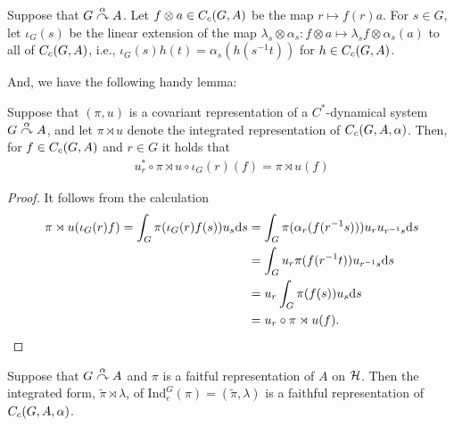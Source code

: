 \begin{definition}
Suppose that $G \stackrel{\alpha}{\curvearrowright} A$. Let $f \otimes a  \in C_c(G,A)$ be the map $r \mapsto f(r)a$. For $s \in G$, let $\iota_G(s)$ be the linear extension of the map $\lambda_s \otimes \alpha_s \colon f \otimes a \mapsto \lambda_s f \otimes \alpha_s(a)$ to all of $C_c(G,A)$, i.e., $\iota_G(s) h(t) = \alpha_s(h(s^{-1}t))$ for $h \in C_c(G,A)$.
\end{definition}
And, we have the following handy lemma:
\begin{lemma}
Suppose that $(\pi,u)$ is a covariant representation of a $C^*$-dynamical system $G \stackrel{\alpha}{\curvearrowright} A$, and let $\pi \rtimes u$ denote the integrated representation of $C_c(G,A,\alpha)$. Then, for $f \in C_c(G,A)$ and $r \in G$ it holds that
\begin{align*}
	 u_r^*  \circ \pi \rtimes u \circ \iota_G(r) (f) =   \pi \rtimes u (f)
\end{align*}
\label{cross:iotaG}
\end{lemma}
\begin{proof}
It follows from the calculation
\begin{align*}
\pi \rtimes u (\iota_G(r)f) = \int_G \pi(\iota_G(r) f(s) ) u_s \mathrm{d} s &= \int_G \pi(\alpha_r(f(r^{-1}s))) u_ru_{r^{-1}s} \mathrm{d} s\\
&= \int_G u_r \pi(f(r^{-1}t)) u_{r^{-1}s} \mathrm{d} s \\
&= u_r \int_G  \pi(f(s)) u_s \mathrm{d} s \\
&= u_r \circ \pi \rtimes u (f).
\end{align*}
\end{proof}
\begin{lemma}
Suppose that $G \stackrel{\alpha}{\curvearrowright} A$ and $\pi$ is a faitful representation of $A$ on $\mathcal{H}$. Then the integrated form, $\tilde{\pi} \rtimes \lambda$, of $\mathrm{Ind}_e^G (\pi)=(\tilde \pi , \lambda)$ is a faithful representation of $C_c(G,A,\alpha)$.
\label{cross:regfaith}
\end{lemma}
